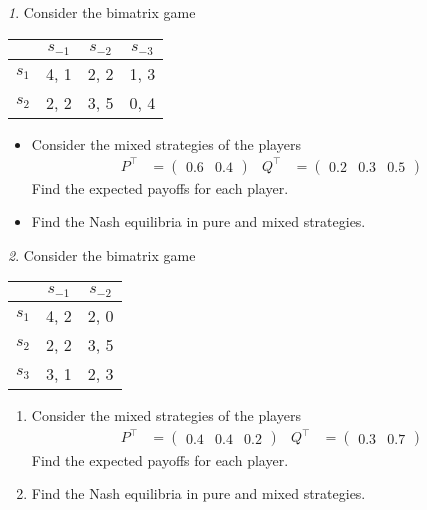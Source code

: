 \documentclass[12pt]{article}
\theoremstyle{remark}
\newtheorem{exercise}{}[subsection]
\begin{document}
\begin{exercise}
Consider the bimatrix game
\begin{center}
	\begin{tabular}{|c||c|c|c|}
	\hline
	& $s_{-1}$ & $s_{-2}$  & $s_{-3}$ \\ \hline \hline
	$s_1$ & 4, 1 & 2, 2 & 1, 3  \\ \hline
	$s_2$ & 2, 2 & 3, 5 & 0, 4 \\ %
	\hline
	\end{tabular}
\end{center}
\begin{itemize}
	\item Consider the mixed strategies of the players
	\begin{align*}
		P^\top&=\begin{pmatrix} 0.6 & 0.4 \end{pmatrix} &
		Q^\top&=\begin{pmatrix} 0.2 & 0.3 & 0.5 \end{pmatrix}
	\end{align*}
	Find the expected payoffs for each player.
	\item Find the Nash equilibria in pure and mixed strategies.
\end{itemize}
\end{exercise}

\begin{exercise}
Consider the bimatrix game
\begin{center}
	\begin{tabular}{|c||c|c|}
	\hline
	& $s_{-1}$ & $s_{-2}$  \\ \hline \hline
	$s_1$ & 4, 2 & 2, 0  \\ \hline
	$s_2$ & 2, 2 & 3, 5  \\ \hline
	$s_3$ & 3, 1 & 2, 3 \\ 
	\hline
	\end{tabular}
\end{center}
\begin{enumerate}
	\item Consider the mixed strategies of the players
	\begin{align*}
		P^\top&=\begin{pmatrix} 0.4 & 0.4 & 0.2 \end{pmatrix} &
		Q^\top&=\begin{pmatrix} 0.3 & 0.7 \end{pmatrix}
	\end{align*}
	Find the expected payoffs for each player.
	\item Find the Nash equilibria in pure and mixed strategies.
\end{enumerate}
\end{exercise}
\end{document}

